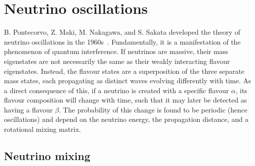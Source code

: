\section{Neutrino oscillations} %
\label{sec:theory_oscillations} %

B. Pontecorvo, Z. Maki, M. Nakagawa, and S. Sakata developed the theory of neutrino oscillations
in the 1960s~\cite{maki1962, pontecorvo1967, pontecorvo1969}. Fundamentally, it is a manifestation
of the phenomenon of quantum interference. If neutrinos are massive, their mass eigenstates are
not necessarily the same as their weakly interacting flavour eigenstates. Instead, the flavour
states are a superposition of the three separate mass states, each propagating as distinct waves
evolving differently with time. As a direct consequence of this, if a neutrino is created with a
specific flavour $\alpha$, its flavour composition will change with time, such that it may later
be detected as having a flavour $\beta$. The probability of this change is found to be periodic
(hence oscillations) and depend on the neutrino energy, the propagation distance, and a rotational
mixing matrix.

\subsection{Neutrino mixing} %
\label{sec:theory_oscillations_mixing} %

